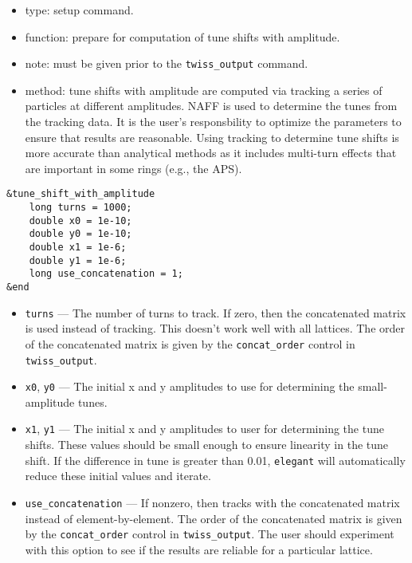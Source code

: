 \documentclass[11pt]{article}
\begin{document}
\begin{itemize}
\item type: setup command.
\item function: prepare for computation of tune shifts with amplitude.
\item note: must be given prior to the \verb|twiss_output| command.
\item method: tune shifts with amplitude are computed via tracking a series of
        particles at different amplitudes.  NAFF is used to determine the tunes
        from the tracking data.  It is the user's responsbility to optimize the
        parameters to ensure that results are reasonable.  Using tracking to determine
        tune shifts is more accurate than analytical methods as it includes multi-turn
        effects that are important in some rings (e.g., the APS).
\end{itemize}

\begin{verbatim}
&tune_shift_with_amplitude
    long turns = 1000;
    double x0 = 1e-10;
    double y0 = 1e-10;
    double x1 = 1e-6;
    double y1 = 1e-6;
    long use_concatenation = 1;
&end
\end{verbatim}

\begin{itemize}
\item \verb|turns| --- The number of turns to track.  If zero, then the concatenated matrix
        is used instead of tracking.  This doesn't work well with all lattices.  The order
        of the concatenated matrix is given by the \verb|concat_order| control in 
        \verb|twiss_output|.
\item \verb|x0|, \verb|y0| --- The initial x and y amplitudes to use for determining the
        small-amplitude tunes.
\item \verb|x1|, \verb|y1| --- The initial x and y amplitudes to user for determining the
        tune shifts.  These values should be small enough to ensure linearity in the tune
        shift.  If the difference in tune is greater than 0.01, \verb|elegant| will automatically
        reduce these initial values and iterate.
\item \verb|use_concatenation| --- If nonzero, then tracks with the concatenated matrix instead
        of element-by-element.  The order
        of the concatenated matrix is given by the \verb|concat_order| control in
        \verb|twiss_output|. The user should experiment with this option to see if the
        results are reliable for a particular lattice.
\end{itemize}
\end{document}

